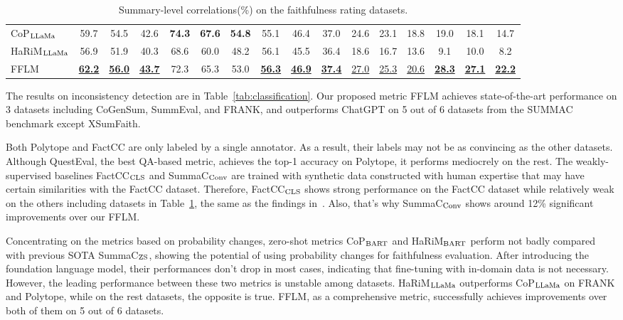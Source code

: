 \begin{table}[h]
\begin{tabular}{l|ccc|ccc|ccc|ccc|ccc}
		\hline
		CoP$_{\rm LLaMa}$  & 59.7 & 54.5 & 42.6 & \textbf{74.3} & \textbf{67.6} & \textbf{54.8} & 55.1 & 46.4 & 37.0 & 24.6 & 23.1 & 18.8 & 19.0 & 18.1 & 14.7 \\
		HaRiM$_{\rm LLaMa}$ & 56.9 & 51.9 & 40.3 & 68.6 & 60.0 & 48.2 & 56.1 & 45.5 & 36.4 & 18.6 & 16.7 & 13.6 & 9.1 & 10.0 & 8.2\\
		FFLM & \underline{\textbf{62.2}} & \underline{\textbf{56.0}} & \underline{\textbf{43.7}} & 72.3 & 65.3 & 53.0 & \underline{\textbf{56.3}} & \underline{\textbf{46.9}} & \underline{\textbf{37.4}} & \underline{27.0} & \underline{25.3} & \underline{20.6} & \underline{\textbf{28.3}} & \underline{\textbf{27.1}} & \underline{\textbf{22.2}} \\
		\bottomrule[1pt]
	\end{tabular}
	\caption{Summary-level correlations(\%) on the faithfulness rating datasets.}
	\label{tab:correlation}
\end{table}



The results on inconsistency detection are in Table~\ref{tab:classification}. 
Our proposed metric FFLM achieves state-of-the-art performance on 3 datasets including CoGenSum, SummEval, and FRANK, and outperforms ChatGPT on 5 out of 6 datasets from the SUMMAC benchmark except XSumFaith.

Both Polytope and FactCC are only labeled by a single annotator. As a result, 
their labels may not be as convincing as the other datasets. 
Although QuestEval, the best QA-based metric,  achieves the top-1 accuracy on Polytope, it performs mediocrely on the rest. The weakly-supervised baselines FactCC$_{\rm CLS}$ and SummaC$_{\rm Conv}$ are trained with synthetic data constructed with human expertise that may have certain similarities with the FactCC dataset. Therefore, FactCC$_{\rm CLS}$ shows strong performance on the FactCC dataset while relatively weak on the others including datasets in Table~\ref{tab:correlation}, the same as the findings in~\citet{laban2022summac}. Also, that's why SummaC$_{\rm Conv}$ shows around 12\% significant improvements over our FFLM. 

Concentrating on the metrics based on probability changes, zero-shot metrics CoP$_{\rm BART}$ and HaRiM$_{\rm BART}$ perform not badly compared with previous SOTA SummaC$_{\rm ZS}$, showing the potential of using probability changes for faithfulness evaluation. 
After introducing the foundation language model, their performances don't drop in most cases, indicating that fine-tuning with in-domain data is not necessary.
However, the leading performance between these two metrics is unstable among datasets. HaRiM$_{\rm LLaMa}$ outperforms CoP$_{\rm LLaMa}$ on FRANK and Polytope, while on the rest datasets, the opposite is true. FFLM, as a comprehensive metric, successfully achieves improvements over both of them on 5 out of 6 datasets.




